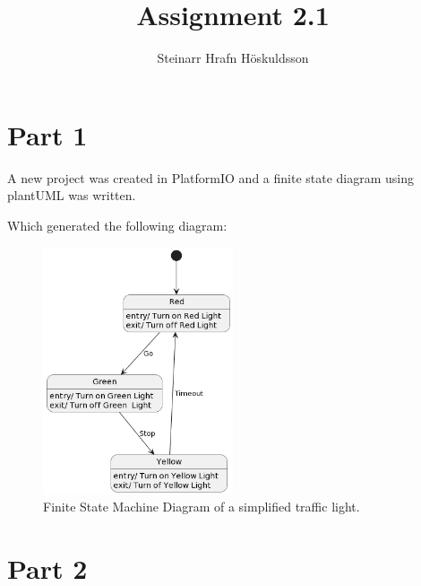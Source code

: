 \documentclass{article}
\title{Assignment 2.1}
\author{Steinarr Hrafn Höskuldsson}
\newcommand{\mycomment}[1]{}
\begin{document}
\pagestyle{firststyle}
{\let\newpage\relax\maketitle}

\mycomment{
\begin{figure}[h]
    \centering
    \texttt{[image: LAB3/Basic1.png]}
    \caption{"Switch test" Breadboard set up}
    \label{fig:Switch_test}
\end{figure}



}

\section*{Part 1}
A new project was created in PlatformIO and a finite state diagram using plantUML was written. 



Which generated the following diagram:
\begin{figure}[h]
    \centering
    \includegraphics[width=0.5\textwidth]{Assignment3_1StateBehaviour/docs/diagrams/fsm1.png}
    \caption{Finite State Machine Diagram of a simplified traffic light.}
    \label{fig:fsmdiagram}
\end{figure}

\section*{Part 2}
\end{document}
